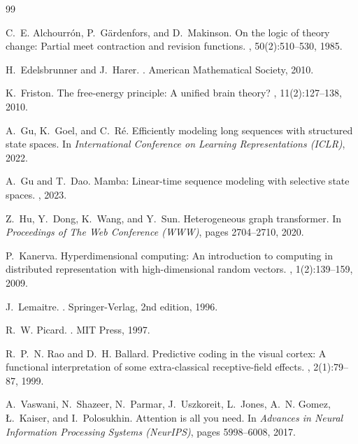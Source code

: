 \documentclass[11pt]{article}
\begin{document}
\begin{thebibliography}{99}

C.~E. Alchourr\'{o}n, P.~G\"{a}rdenfors, and D.~Makinson.
\newblock On the logic of theory change: Partial meet contraction and revision functions.
, 50(2):510--530, 1985.

H.~Edelsbrunner and J.~Harer.
.
\newblock American Mathematical Society, 2010.

K.~Friston.
\newblock The free-energy principle: A unified brain theory?
, 11(2):127--138, 2010.

A.~Gu, K.~Goel, and C.~R\'{e}.
\newblock Efficiently modeling long sequences with structured state spaces.
\newblock In {\em International Conference on Learning Representations (ICLR)}, 2022.

A.~Gu and T.~Dao.
\newblock Mamba: Linear-time sequence modeling with selective state spaces.
, 2023.

Z.~Hu, Y.~Dong, K.~Wang, and Y.~Sun.
\newblock Heterogeneous graph transformer.
\newblock In {\em Proceedings of The Web Conference (WWW)}, pages 2704--2710, 2020.

P.~Kanerva.
\newblock Hyperdimensional computing: An introduction to computing in distributed representation with high-dimensional random vectors.
, 1(2):139--159, 2009.

J.~Lemaitre.
.
\newblock Springer-Verlag, 2nd edition, 1996.

R.~W. Picard.
.
\newblock MIT Press, 1997.

R.~P.~N. Rao and D.~H. Ballard.
\newblock Predictive coding in the visual cortex: A functional interpretation of some extra-classical receptive-field effects.
, 2(1):79--87, 1999.

A.~Vaswani, N.~Shazeer, N.~Parmar, J.~Uszkoreit, L.~Jones, A.~N. Gomez, {\L}.~Kaiser, and I.~Polosukhin.
\newblock Attention is all you need.
\newblock In {\em Advances in Neural Information Processing Systems (NeurIPS)}, pages 5998--6008, 2017.


\end{thebibliography}
\end{document}
